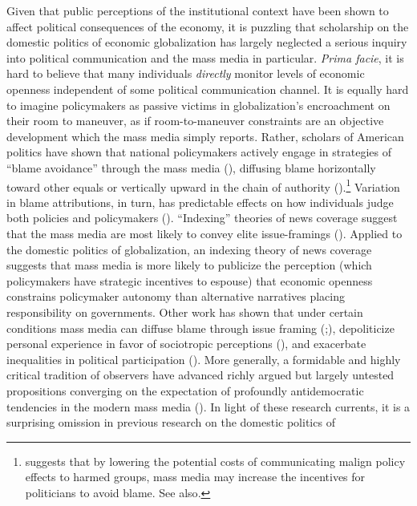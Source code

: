 \documentclass[12pt]{report}
\begin{document}
Given that public perceptions of the institutional context have been shown to affect political
consequences of the economy, it is puzzling that scholarship on the domestic politics of economic
globalization has largely neglected a serious inquiry into political communication and the mass
media in particular. \emph{Prima facie}, it is hard to believe that many individuals \emph{directly}
monitor levels of economic openness independent of some political communication channel. It is
equally hard to imagine policymakers as passive victims in globalization's encroachment on their
room to maneuver, as if room-to-maneuver constraints are an objective development which the mass
media simply reports. Rather, scholars of American politics have shown that national policymakers
actively engage in strategies of ``blame avoidance'' through the mass media
(\citealt{Weaver:1986ku,Jacobson:1983tg}), diffusing blame horizontally toward other equals or
vertically upward in the chain of authority (\citealt{McGraw:1990kk,McGraw:1991up}).\footnote{\citet[20]{Hood:2002ko}suggests that by lowering the potential costs of communicating malign policy effects to harmed groups, mass media may increase the incentives for politicians to avoid blame. See also\citet{Hood:2009ed}.} Variation in blame attributions, in turn, has predictable effects on how individuals judge both policies and policymakers
(\citealt{McGraw:1995up}). ``Indexing'' theories of news coverage suggest that the mass media are
most likely to convey elite issue-framings (\citealt{Bennett:1990bp,Zaller:1996vs,Bennett:2006gc}).
Applied to the domestic politics of globalization, an indexing theory of news coverage suggests that
mass media is more likely to publicize the perception (which policymakers have strategic incentives
to espouse) that economic openness constrains policymaker autonomy than alternative narratives
placing responsibility on governments. Other work has shown that under certain conditions mass media
can diffuse blame through issue framing (\citealt{Iyengar:1987uo};\citealt{Iyengar:1991uf}),
depoliticize personal experience in favor of sociotropic perceptions (\citealt{Mutz:1992ww}), and
exacerbate inequalities in political participation (\citealt{Norris:2000uf}). More generally, a
formidable and highly critical tradition of observers have advanced richly argued but largely
untested propositions converging on the expectation of profoundly antidemocratic tendencies in the
modern mass media (\citealt{Herman:1988ta,adorno2001culture,mcchesney2000rich}). In light of these
research currents, it is a surprising omission in previous research on the domestic politics of
\end{document}
